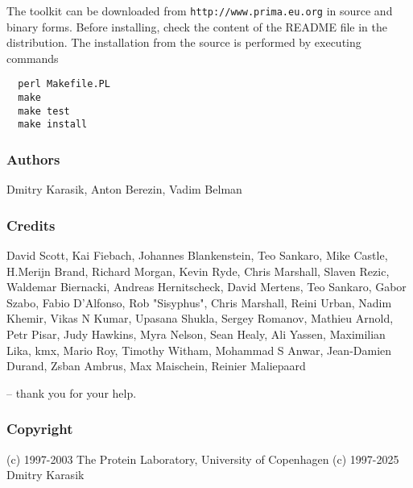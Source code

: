 \documentclass{report}
\begin{document}
The toolkit can be downloaded from \texttt{http://www.prima.eu.org} in
source and binary forms. Before installing, check the content of the README file
in the distribution. The installation from the source is performed by
executing commands
\begin{verbatim}
  perl Makefile.PL
  make
  make test
  make install
\end{verbatim}

\subsubsection{Authors}

Dmitry Karasik,
Anton Berezin,
Vadim Belman

\subsubsection{Credits}

David Scott,
Kai Fiebach,
Johannes Blankenstein,
Teo Sankaro,
Mike Castle,
H.Merijn Brand,
Richard Morgan,
Kevin Ryde,
Chris Marshall,
Slaven Rezic,
Waldemar Biernacki,
Andreas Hernitscheck,
David Mertens,
Teo Sankaro,
Gabor Szabo,
Fabio D'Alfonso,
Rob "Sisyphus",
Chris Marshall,
Reini Urban,
Nadim Khemir,
Vikas N Kumar,
Upasana Shukla,
Sergey Romanov,
Mathieu Arnold,
Petr Pisar,
Judy Hawkins,
Myra Nelson,
Sean Healy,
Ali Yassen,
Maximilian Lika,
kmx,
Mario Roy,
Timothy Witham,
Mohammad S Anwar,
Jean-Damien Durand,
Zsban Ambrus,
Max Maischein,
Reinier Maliepaard

-- thank you for your help.

\subsubsection{Copyright}

(c) 1997-2003 The Protein Laboratory, University of Copenhagen
(c) 1997-2025 Dmitry Karasik
\end{document}
